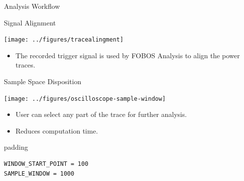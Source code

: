 \documentclass[xcolor=pdftex,dvipsnames,table,final]{beamer}
\begin{document}
\begin{frame}[fragile]{}
\begin{columns}[t]
\begin{column}{.31\linewidth}
\begin{block}{Analysis Workflow}
       \end{block}
       \begin{block}{Signal Alignment}
        \begin{minipage}[t]{0.49\linewidth}
          \texttt{[image: ../figures/tracealingment]}
        \end{minipage}%
        \begin{minipage}[t]{0.49\linewidth}
         \vspace{-4cm}
         \begin{itemize}
          \item The recorded trigger signal is used by FOBOS Analysis to align the
                power traces.
         \end{itemize} 
        \end{minipage}
       \end{block}
       \begin{block}{Sample Space Disposition}
        \begin{minipage}[t]{0.49\linewidth}%
		\texttt{[image: ../figures/oscilloscope-sample-window]}
        \end{minipage}%
        \begin{minipage}[t]{0.49\linewidth}%
          \vspace{-6.5cm}%
          \begin{itemize}
            \item User can select any part of the trace for further analysis.
            \item Reduces computation time.
          \end{itemize} 
          \begin{center}
            \begin{beamercolorbox}[rounded=true]{padding}%
               \footnotesize%
              \begin{lstlisting}
WINDOW_START_POINT = 100
SAMPLE_WINDOW = 1000
              \end{lstlisting}
            \end{beamercolorbox}
          \end{center}
        \end{minipage}
       \end{block}

\end{column}
\end{columns}
\end{frame}
\end{document}
